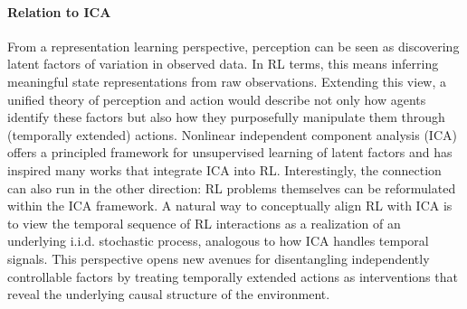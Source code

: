 \documentclass{article}
\theoremstyle{plain}
\theoremstyle{definition}
\theoremstyle{remark}
\begin{document}

\paragraph{Relation to ICA}
From a representation learning perspective, perception can be seen as discovering latent factors of variation in observed data. In RL terms, this means inferring meaningful state representations from raw observations. Extending this view, a unified theory of perception and action would describe not only how agents identify these factors but also how they purposefully manipulate them through (temporally extended) actions.
Nonlinear independent component analysis (ICA) offers a principled framework for unsupervised learning of latent factors and has inspired many works that integrate ICA into RL. Interestingly, the connection can also run in the other direction: RL problems themselves can be reformulated within the ICA framework. A natural way to conceptually align RL with ICA is to view the temporal sequence of RL interactions as a realization of an underlying i.i.d. stochastic process, analogous to how ICA handles temporal signals. This perspective opens new avenues for disentangling independently controllable factors by treating temporally extended actions as interventions that reveal the underlying causal structure of the environment.
\end{document}

